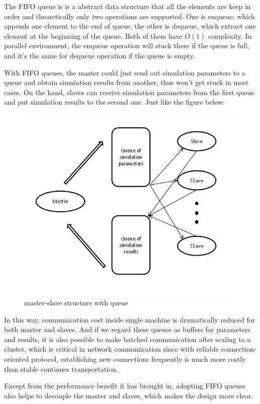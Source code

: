 \documentclass[12pt,a4paper]{report}
\begin{document}
The FIFO queue is is a abstract data structure that all the elements are keep in order and theoretically only two operations are supported. One is enqueue, which appends one element to the end of queue, the other is dequeue, which extract one element at the beginning of the queue. Both of them have $O(1)$ complexity. In parallel environment, the enqueue operation will stuck there if the queue is full, and it's the same for dequeue operation if the queue is empty.

With FIFO queues, the master could just send out simulation parameters to a queue and obtain simulation results from another, thus won't get stuck in most cases. On the hand, slaves can receive simulation parameters from the first queue and put simulation results to the second one. Just like the figure below:

\begin{figure}[ht]
\centering
\includegraphics[width=120mm]{master-slave-queue.png}
\caption{master-slave structure with queue}
\end{figure}

In this way, communication cost inside single machine is dramatically reduced for both master and slaves. And if we regard these queues as buffers for parameters and results, it is also possible to make batched communication after scaling to a cluster, which is critical in network communication since with reliable connection-oriented protocol, establishing new connections frequently is much more costly than stable continues transportation.

Except from the performance benefit it has brought in, adopting FIFO queues also helps to decouple the master and slaves, which makes the design more clear.
\end{document}
